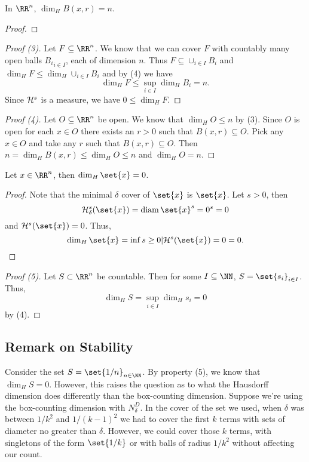 \begin{lemma}
	In $\RR^n$, $\dim_H B(x,r) = n$.
\end{lemma}
\begin{proof}
\end{proof}

\begin{proof}[Proof (3)]
	Let $F\subseteq\RR^n$.
	We know that we can cover $F$ with countably many open balls ${B_i}_{i\in I}$, each of dimension $n$.
	Thus $F\subseteq \cup_{i\in I} B_i$ and $\dim_H F \leq \dim_H \cup_{i\in I} B_i$ and by (4) we have
	\[
		\dim_H F \leq \sup\limits_{i\in I} \dim_H B_i = n.
	\]
	Since $\mathcal{H}^s$ is a measure, we have $0\leq \dim_H F$.
\end{proof}

\begin{proof}[Proof (4)]
	Let $O\subseteq\RR^n$ be open.
	We know that $\dim_H O\leq n$ by (3).
	Since $O$ is open for each $x\in O$ there exists an $r>0$ such that $B(x,r)\subseteq O$.
	Pick any $x\in O$ and take any $r$ such that $B(x,r)\subseteq O$.
	Then $n=\dim_H B(x,r) \leq \dim_H O \leq n$ and $\dim_H O = n$.
\end{proof}

\begin{lemma}
	Let $x\in\RR^n$, then $\dim_H \set{x} = 0$.
\end{lemma}
\begin{proof}
	Note that the minimal $\delta$ cover of $\set{x}$ is $\set{x}$.
	Let $s > 0$, then
	\[
		\hm^s_\delta(\set{x})=\diam \set{x}^s = 0^s = 0
	\]
	and $\hm^s(\set{x}) = 0$.
	Thus,
	\[
		\dim_H \set{x} = \inf{s\geq 0| \hm^s(\set{x}) = 0} = 0.
	\]
\end{proof}

\begin{proof}[Proof (5)]
	Let $S\subset\RR^n$ be countable.
	Then for some $I\subseteq\NN$, $S=\set{s_i}_{i\in I}$.
	Thus,
	\[
		\dim_H S = \sup\limits_{i\in I} \dim_H s_i = 0
	\]
	by (4).
\end{proof}

\subsection{Remark on Stability}

Consider the set $S=\set{1/n}_{n\in\NN}$.
By property (5), we know that $\dim_H S=0$.
However, this raises the question as to what the Hausdorff dimension does differently than the box-counting dimension.
Suppose we're using the box-counting dimension with $N^D_\delta$.
In the cover of the set we used, when $\delta$ was between $1/k^2$ and $1/{(k-1)}^2$ we had to cover the first $k$ terms with sets of diameter no greater than $\delta$.
However, we could cover those $k$ terms, with singletons of the form $\set{1/k}$ or with balls of radius ${1/k^2}$ without affecting our count.

